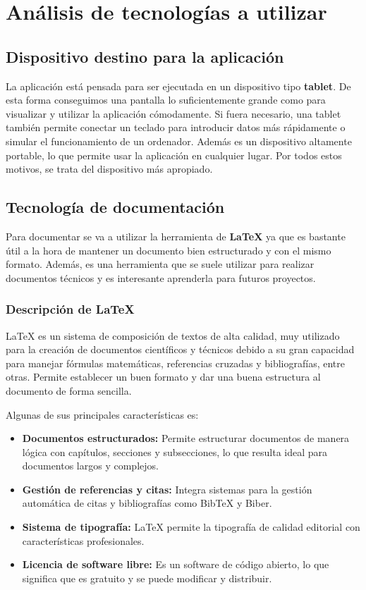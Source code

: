 \chapter{Análisis de tecnologías a utilizar}
\label{chap:Technologies}


\section{Dispositivo destino para la aplicación}

La aplicación está pensada para ser ejecutada en un dispositivo tipo \textbf{tablet}. De esta forma conseguimos una pantalla lo suficientemente grande como para visualizar y utilizar la aplicación cómodamente. Si fuera necesario, una tablet también permite conectar un teclado para introducir datos más rápidamente o simular el funcionamiento de un ordenador. Además es un dispositivo altamente portable, lo que permite usar la aplicación en cualquier lugar. Por todos estos motivos, se trata del dispositivo más apropiado. 

\section{Tecnología de documentación}

Para documentar se va a utilizar la herramienta de \textbf{LaTeX} ya que es bastante útil a la hora de mantener un documento bien estructurado y con el mismo formato. Además, es una herramienta que se suele utilizar para realizar documentos técnicos y es interesante aprenderla para futuros proyectos. 

\subsection{Descripción de LaTeX}

LaTeX es un sistema de composición de textos de alta calidad, muy utilizado para la creación de documentos científicos y técnicos debido a su gran capacidad para manejar fórmulas matemáticas, referencias cruzadas y bibliografías, entre otras. Permite establecer un buen formato y dar una buena estructura al documento de forma sencilla. \cite{latex}

Algunas de sus principales características es: 

\begin{itemize}
	\item \textbf{Documentos estructurados:} Permite estructurar documentos de manera lógica con capítulos, secciones y subsecciones, lo que resulta ideal para documentos largos y complejos.
	\item \textbf{Gestión de referencias y citas:} Integra sistemas para la gestión automática de citas y bibliografías como BibTeX y Biber.
	\item \textbf{Sistema de tipografía:} LaTeX permite la tipografía de calidad editorial con características profesionales.
	\item \textbf{Licencia de software libre:} Es un software de código abierto, lo que significa que es gratuito y se puede modificar y distribuir.
\end{itemize}  

